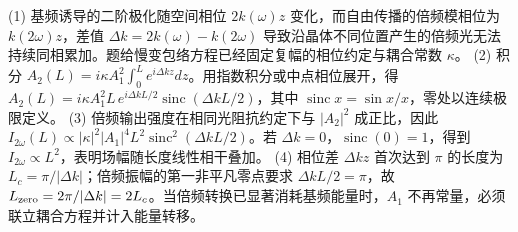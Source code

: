 (1) 基频诱导的二阶极化随空间相位 \(2k(\omega)z\) 变化，而自由传播的倍频模相位为 \(k(2\omega)z\)，差值 \(\Delta k=2k(\omega)-k(2\omega)\) 导致沿晶体不同位置产生的倍频光无法持续同相累加。题给慢变包络方程已经固定复幅的相位约定与耦合常数 \(\kappa\)。
(2) 积分 \(A_2(L)=i\kappa A_1^2\int_0^L e^{i\Delta kz}dz\)。用指数积分或中点相位展开，得 \(A_2(L)=i\kappa A_1^2L\,e^{i\Delta kL/2}\operatorname{sinc}(\Delta kL/2)\)，其中 \(\operatorname{sinc}x=\sin x/x\)，零处以连续极限定义。
(3) 倍频输出强度在相同光阻抗约定下与 \(|A_2|^2\) 成正比，因此 \(I_{2\omega}(L)\propto|\kappa|^2|A_1|^4 L^2\operatorname{sinc}^2(\Delta kL/2)\)。若 \(\Delta k=0\)，\(\operatorname{sinc}(0)=1\)，得到 \(I_{2\omega}\propto L^2\)，表明场幅随长度线性相干叠加。
(4) 相位差 \(\Delta kz\) 首次达到 \(\pi\) 的长度为 \(L_c=\pi/|\Delta k|\)；倍频振幅的第一非平凡零点要求 \(\Delta kL/2=\pi\)，故 \(L_{\rm zero}=2\pi/|\Delta k|=2L_c\)。当倍频转换已显著消耗基频能量时，\(A_1\) 不再常量，必须联立耦合方程并计入能量转移。
